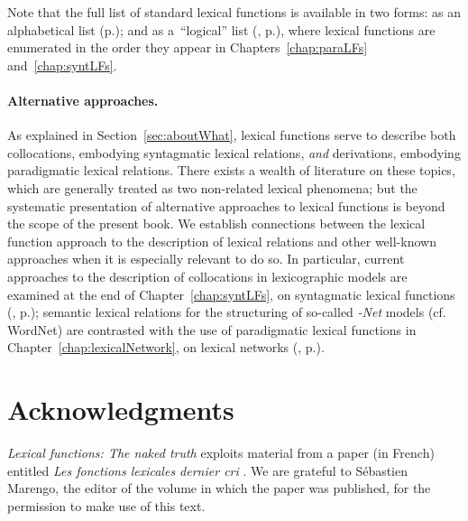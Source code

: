 Note that the full list of standard lexical functions is available in two forms: as an alphabetical list (p.\thinspace\pageref{chap:listLFs}); and as a~``logical'' list (, p.\thinspace\pageref{tab:systFL}), where lexical functions are enumerated in the order they appear in Chapters~\ref{chap:paraLFs} and~\ref{chap:syntLFs}.

\paragraph*{Alternative approaches.}

As explained in Section~\ref{sec:aboutWhat}, lexical functions serve to describe both collocations, embodying syntagmatic lexical relations, \emph{and} derivations, embodying paradigmatic lexical relations. There exists a wealth of literature on these topics, which are generally treated as two non-related lexical phenomena; but the systematic presentation of alternative approaches to lexical functions is beyond the scope of the present book. We establish connections between the lexical function approach to the description of lexical relations and other well-known approaches when it is especially relevant to do so. In particular, current approaches to the description of collocations in lexicographic models are examined at the end of Chapter~\ref{chap:syntLFs}, on syntagmatic lexical functions (, p.\thinspace\pageref{sec:Non-LFApproachesCollocations}); semantic lexical relations for the structuring of so-called \textit{-Net} models (cf. WordNet) are contrasted with the use of paradigmatic lexical functions in Chapter~\ref{chap:lexicalNetwork}, on lexical networks (, p.\thinspace\pageref{sec:shapeOfLexicons}).

\section*{Acknowledgments}

\textit{Lexical functions: The naked truth} exploits material from a paper (in French) entitled \textit{Les fonctions lexicales dernier cri} \parencite{MelcukPolguere2021}. We are grateful to Sébastien Marengo, the editor of the volume in which the paper was published, for the permission to make use of this text.

